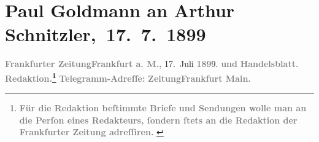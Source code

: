 

         
         \renewcommand{\erwaehntePersonen}{Personen: Hermann Bahr, Max Eugen Burckhard, Paul Goldmann, Rémy de Gourmont, Gisela Hajek, Heinrich Kanner, Louise Schnitzler}
         \renewcommand{\erwaehnteInstitutionen}{Institutionen: Burgtheater, Die Zeit. Wiener Wochenschrift, Frankfurter Zeitung, Neues Wiener Tagblatt, Wiener Rundschau, Österreichische Volks-Zeitung}
         \renewcommand{\erwaehnteOrte}{Orte: Frankfurt am Main, Paris, Velden am Wörthersee, Wien}
         \renewcommand{\erwaehnteWerke}{}
               \section[ Paul Goldmann an Arthur Schnitzler, 17. 7. 1899]{ Paul Goldmann an Arthur Schnitzler, 17. 7. 1899}\nopagebreak{}\rehead{ }\begin{ledgroupsized}[t]{13cm}\normalsize\beginnumbering \toendnotes[C]{\smallbreak\pagebreak[2]} 
\toendnotes[C]{\smallbreak}\pstart
           \noindent{}{\pb}\textcolor{gray}{\textbf{\textbf{Frankfurter Zeitung}}}\hfill \textcolor{gray}{\textbf{\textbf{Frankfurt a. M.,}}}{ }17. Juli \textcolor{gray}{\textbf{189}}9.\pend
           \pstart
           \textcolor{gray}{\textbf{und}}\pend
           \pstart
           \textcolor{gray}{\textbf{Handelsblatt.}}\pend
           \pstart
           \textcolor{gray}{\textbf{\textbf{Redaktion.}\footnote{\noindent{}\textcolor{gray}{\textbf{Für die Redaktion beſtimmte Briefe und Sendungen wolle man
                                  an die Perſon eines Redakteurs,
                              ſondern ſtets \textbf{an die Redaktion der Frankfurter Zeitung} adreſſiren. }}}}}\pend
           \pstart
           \textcolor{gray}{\textbf{Telegramm-Adreſſe:}}\pend
           \pstart
           \textcolor{gray}{\textbf{\textbf{ZeitungFrankfurt Main.}}}\pend

\end{ledgroupsized}
